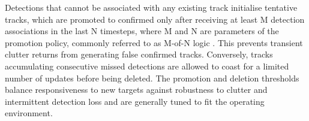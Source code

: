 Detections that cannot be associated with any existing track initialise tentative 
tracks, which are promoted to confirmed only after receiving at least M detection
associations in the last N timesteps, where M and N are parameters of the promotion 
policy, commonly referred to as M-of-N logic 
\cite{blackman1999modern}. This prevents transient clutter returns from generating 
false confirmed tracks. Conversely, tracks accumulating consecutive missed detections 
are allowed to coast for a limited number of updates before being deleted. The 
promotion and deletion thresholds balance responsiveness to new targets against 
robustness to clutter and intermittent detection loss and are generally tuned to
fit the operating environment.
